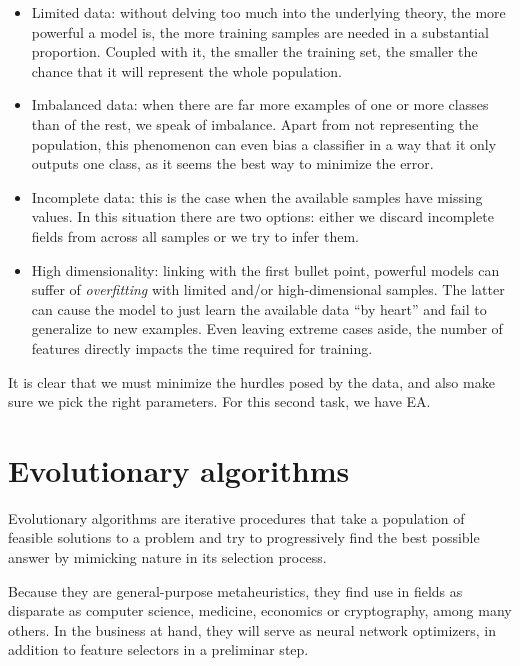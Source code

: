     \begin{itemize}

    	\item
    	Limited data: without delving too much into the underlying theory, the more powerful a model is, the more training samples are needed in a substantial proportion. Coupled with it, the smaller the training set, the smaller the chance that it will represent the whole population.

    	\item
    	Imbalanced data: when there are far more examples of one or more classes than of the rest, we speak of imbalance. Apart from not representing the population, this phenomenon can even bias a classifier in a way that it only outputs one class, as it seems the best way to minimize the error.

    	\item
    	Incomplete data: this is the case when the available samples have missing values. In this situation there are two options: either we discard incomplete fields from across all samples or we try to infer them.

    	\item
    	High dimensionality: linking with the first bullet point, powerful models can suffer of \textit{overfitting} with limited and/or high-dimensional samples. The latter can cause the model to just learn the available data ``by heart'' and fail to generalize to new examples. Even leaving extreme cases aside, the number of features directly impacts the time required for training.

    \end{itemize}

    It is clear that we must minimize the hurdles posed by the data, and also make sure we pick the right parameters. For this second task, we have \acf{EA}.

\section{Evolutionary algorithms}

	Evolutionary algorithms are iterative procedures that take a population of feasible solutions to a problem and try to progressively find the best possible answer by mimicking nature in its selection process. 

	Because they are general-purpose metaheuristics, they find use in fields as disparate as computer science, medicine, economics or cryptography, among many others. In the business at hand, they will serve as neural network optimizers, in addition to feature selectors in a preliminar step.

